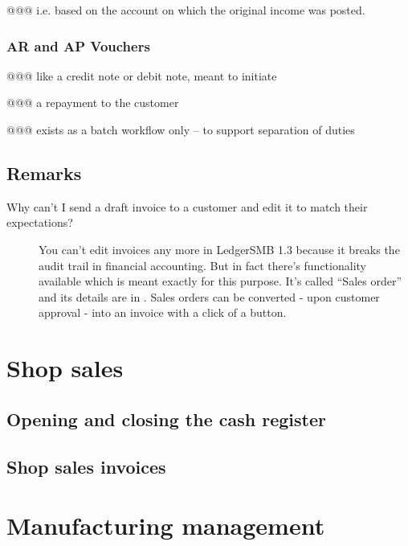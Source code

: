 @@@ i.e. based on the account on which the original income was posted.

\subsection{AR and AP Vouchers}

@@@ like a credit note or debit note, meant to initiate

@@@ a repayment to the customer

@@@ exists as a batch workflow only -- to support separation of duties


\section{Remarks}
\label{sec-business-processes-accounting-remarks}


\begin{description}
\item [Why can't I send a draft invoice to a \gls{customer} and edit it
   to match their expectations?] 
You can't edit invoices any more in LedgerSMB 1.3 because it breaks the audit trail
in financial accounting. But in fact there's functionality available which is meant
exactly for this purpose. It's called ``Sales order'' and its details are in
. Sales orders can be converted - upon \gls{customer} approval -
into an invoice with a click of a button.
\end{description}


\chapter{Shop sales}
\label{cha-business-processes-shop-sales}

\section{Opening and closing the cash register}
\label{sec-business-processes-shop-register-opening-closing}

\section{Shop sales invoices}
\label{sec-business-processes-shop-invoicing}

\chapter{Manufacturing management}
\label{cha-business-processes-manufacturing}

